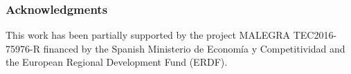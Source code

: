 \documentclass{article}
\begin{document}











\subsubsection*{Acknowledgments}

This work has been partially supported by the project  MALEGRA TEC2016-75976-R financed by the Spanish Ministerio de Econom\'{i}a y Competitividad and the European Regional Development Fund (ERDF).


\medskip



%
\end{document}
